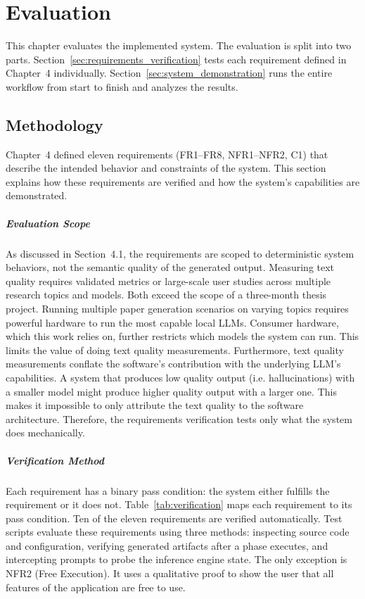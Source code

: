 \chapter{Evaluation}
This chapter evaluates the implemented system.
The evaluation is split into two parts.
Section~\ref{sec:requirements_verification} tests each requirement defined in Chapter~4 individually.
Section~\ref{sec:system_demonstration} runs the entire workflow from start to finish and analyzes the results.

\section{Methodology}
Chapter~4 defined eleven requirements (FR1--FR8, NFR1--NFR2, C1) that describe the intended behavior and constraints of the system.
This section explains how these requirements are verified and how the system's capabilities are demonstrated.

\paragraph{Evaluation Scope}
\label{sec:evaluation_scope}
As discussed in Section~4.1, the requirements are scoped to deterministic system behaviors, not the semantic quality of the generated output.
Measuring text quality requires validated metrics \cite{Jourdan2025IdentifyingRE} or large-scale user studies across multiple research topics and models.
Both exceed the scope of a three-month thesis project.
Running multiple paper generation scenarios on varying topics requires powerful hardware to run the most capable local LLMs.
Consumer hardware, which this work relies on, further restricts which models the system can run.
This limits the value of doing text quality measurements.
Furthermore, text quality measurements conflate the software's contribution with the underlying LLM's capabilities.
A system that produces low quality output (i.e. hallucinations) with a smaller model might produce higher quality output with a larger one.
This makes it impossible to only attribute the text quality to the software architecture.
Therefore, the requirements verification tests only what the system does mechanically.


\paragraph{Verification Method}
Each requirement has a binary pass condition: the system either fulfills the requirement or it does not.
Table~\ref{tab:verification} maps each requirement to its pass condition.
Ten of the eleven requirements are verified automatically.
Test scripts evaluate these requirements using three methods: inspecting source code and configuration, verifying generated artifacts after a phase executes, and intercepting prompts to probe the inference engine state.
The only exception is NFR2 (Free Execution).
It uses a qualitative proof to show the user that all features of the application are free to use.

